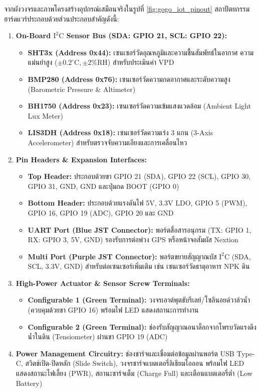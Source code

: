 จากผังวงจรและภาพโครงสร้างอุปกรณ์เสมือนจริงในรูปที่ \ref{fig:gogo_iot_pinout} สถาปัตยกรรมฮาร์ดแวร์ประกอบด้วยส่วนประกอบสำคัญดังนี้:
\begin{enumerate}[leftmargin=1.5em]
    \item \textbf{On-Board $\text{I}^2\text{C}$ Sensor Bus (SDA: GPIO 21, SCL: GPIO 22):}
    \begin{itemize}
        \item \textbf{SHT3x (Address 0x44):} เซนเซอร์วัดอุณหภูมิและความชื้นสัมพัทธ์ในอากาศ ความแม่นยำสูง ($\pm 0.2^\circ\text{C}, \pm 2\%\text{RH}$) สำหรับประเมินค่า VPD
        \item \textbf{BMP280 (Address 0x76):} เซนเซอร์วัดความกดอากาศและระดับความสูง (Barometric Pressure \& Altimeter)
        \item \textbf{BH1750 (Address 0x23):} เซนเซอร์วัดความเข้มแสงแวดล้อม (Ambient Light Lux Meter)
        \item \textbf{LIS3DH (Address 0x18):} เซนเซอร์วัดความเร่ง 3 แกน (3-Axis Accelerometer) สำหรับตรวจจับความเอียงและการเคลื่อนไหว
    \end{itemize}
    \item \textbf{Pin Headers \& Expansion Interfaces:}
    \begin{itemize}
        \item \textbf{Top Header:} ประกอบด้วยขา GPIO 21 (SDA), GPIO 22 (SCL), GPIO 30, GPIO 31, GND, GND และปุ่มกด BOOT (GPIO 0)
        \item \textbf{Bottom Header:} ประกอบด้วยแรงดันไฟ 5V, 3.3V LDO, GPIO 5 (PWM), GPIO 16, GPIO 19 (ADC), GPIO 20 และ GND
        \item \textbf{UART Port (Blue JST Connector):} พอร์ตสื่อสารอนุกรม (TX: GPIO 1, RX: GPIO 3, 5V, GND) รองรับการต่อพ่วง GPS หรือหน้าจอสัมผัส Nextion
        \item \textbf{Multi Port (Purple JST Connector):} พอร์ตขยายสัญญาณบัส $\text{I}^2\text{C}$ (SDA, SCL, 3.3V, GND) สำหรับต่อเซนเซอร์เพิ่มเติม เช่น เซนเซอร์วัดธาตุอาหาร NPK ดิน
    \end{itemize}
    \item \textbf{High-Power Actuator \& Sensor Screw Terminals:}
    \begin{itemize}
        \item \textbf{Configurable 1 (Green Terminal):} วงจรเอาต์พุตขับรีเลย์/โซลินอยด์วาล์วน้ำ (ควบคุมด้วยขา GPIO 16) พร้อมไฟ LED แสดงสถานะการทำงาน
        \item \textbf{Configurable 2 (Green Terminal):} ช่องรับสัญญาณอนาล็อกจากโพรบวัดแรงดึงน้ำในดิน (Tensiometer) ผ่านขา GPIO 19 (ADC)
    \end{itemize}
    \item \textbf{Power Management Circuitry:} ช่องชาร์จและเชื่อมต่อข้อมูลผ่านพอร์ต USB Type-C, สวิตช์เปิด-ปิดหลัก (Slide Switch), วงจรชาร์จแบตเตอรี่ลิเธียมไอออน พร้อมไฟ LED แสดงสถานะไฟเลี้ยง (PWR), สถานะชาร์จเต็ม (Charge Full) และเตือนแบตเตอรี่ต่ำ (Low Battery)
\end{enumerate}

